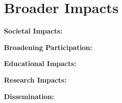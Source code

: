 \section{Broader Impacts}
\label{sec:broader}

{\bf Societal Impacts:} 

{\bf Broadening Participation:} 

{\bf Educational Impacts:}

{\bf Research Impacts:}

{\bf Dissemination:}

